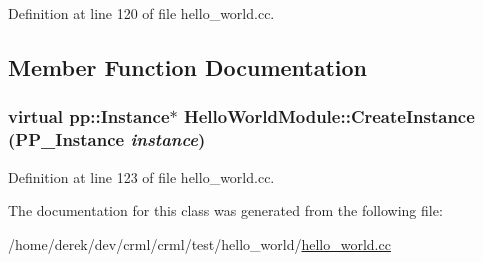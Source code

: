 Definition at line 120 of file hello\_\-world.cc.



\subsection{Member Function Documentation}
\hypertarget{class_hello_world_module_a6ee0eeeb3ed2f95b819adfd4df33c47f}{
\subsubsection[{CreateInstance}]{\setlength{\rightskip}{0pt plus 5cm}virtual pp::Instance$\ast$ HelloWorldModule::CreateInstance (PP\_\-Instance {\em instance})}}
\label{class_hello_world_module_a6ee0eeeb3ed2f95b819adfd4df33c47f}


Definition at line 123 of file hello\_\-world.cc.



The documentation for this class was generated from the following file:\begin{DoxyCompactItemize}
\item 
/home/derek/dev/crml/crml/test/hello\_\-world/\hyperlink{hello__world_8cc}{hello\_\-world.cc}\end{DoxyCompactItemize}
